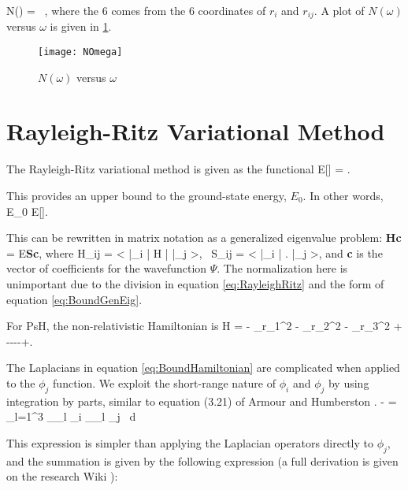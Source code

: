 \documentclass[Dissertation.tex]{subfiles}
\begin{document}
\beq
\label{eq:NumberTermsOmega}
N(\omega) =  \, ,
\eeq
\noindent where the 6 comes from the 6 coordinates of $r_i$ and $r_{ij}$.  A plot of $N(\omega)$ versus $\omega$ is given in \cref{fig:NOmega}.

\begin{figure}[H]
	\centering
	\texttt{[image: NOmega]}
	\caption{$N(\omega)$ versus $\omega$}
	\label{fig:NOmega}
\end{figure}


\section{Rayleigh-Ritz Variational Method}
The Rayleigh-Ritz variational method is given as the functional
\beq
\label{eq:RayleighRitz}
E[\Psi] = .
\eeq

\noindent This provides an upper bound to the ground-state energy, $E_0$.  In other words,
\beq
E_0 \leq E[\Psi].
\eeq

This can be rewritten in matrix notation as a generalized eigenvalue problem: \cite{}
\beq
\label{eq:BoundGenEig}
\textbf{Hc} = E\textbf{Sc},
\eeq
where
\beq
\label{eq:HijSij}
H_{ij} = \left< \bar{\phi}_i \left| H \right| \bar{\phi}_j \right>\!, \, S_{ij} = \left< \bar{\phi}_i \left| \right.\! \bar{\phi}_j \right>, 
\eeq
and \textbf{c} is the vector of coefficients for the wavefunction $\Psi$.  The normalization here is unimportant due to the division in equation \ref{eq:RayleighRitz} and the form of equation \ref{eq:BoundGenEig}.

For PsH, the non-relativistic Hamiltonian is
\beq
\label{eq:BoundHamiltonian}
H = - \nabla_{r_1}^2 -  \nabla_{r_2}^2 -  \nabla_{r_3}^2 + ----+.
\eeq

The Laplacians in equation \ref{eq:BoundHamiltonian} are complicated when applied to the $\phi_j$ function.  We exploit the short-range nature of $\phi_i$ and $\phi_j$ by using integration by parts, similar to equation (3.21) of Armour and Humberston \cite{Armour1991}.
\beq
\label{eq:BoundGradient}
- = \int \sum_{l=1}^3 \bm{\nabla}_{\!_l} \phi_i \bm{\cdot} \bm{\nabla}_{\!_l} \phi_j \, d\tau
\eeq

\noindent This expression is simpler than applying the Laplacian operators directly to $\phi_j$, and the summation is given by the following expression (a full derivation is given on the research Wiki \cite{Wiki}):
\end{document}
